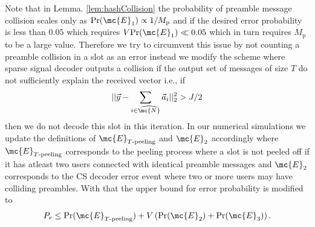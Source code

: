 \documentclass[final,onecolumn,12pt]{IEEEtran}
\def\Pr{\mathrm{Pr}}
\begin{document}
\begin{remark}
Note that in Lemma. \ref{lem:hashCollision} the probability of preamble message collision scales only as $\Pr(\mc{E}_1)\propto 1/M_\mathrm{p}$ and if the desired error probability is less than $0.05$ which requires $V\Pr(\mc{E}_1)\ll 0.05$ which in turn requires $M_\mathrm{p}$ to be a large value. Therefore we try to circumvent this issue by not counting a preamble collision in a slot as an error instead we modify the scheme where sparse signal decoder outputs a collision if the output set of messages of size $T$ do not sufficiently explain the received vector i.e., if
\[
||\vec{y}-\sum_{i\in\widehat{\mc{N}}}\vec{a}_i||_2^2 >J/2
\]
then we do not decode this slot in this iteration. In our numerical simulations we update the definitions of $\mc{E}_{T\text{-peeling}}$ and $\mc{E}_2$ accordingly where $\mc{E}_{T\text{-peeling}}$ corresponds to the peeling process where a slot is not peeled off if it has atleast two users connected with identical preamble messages and $\mc{E}_2$  corresponds to the CS decoder error event where two or more users may have colliding preambles. With that the upper bound for error probability is modified to
\begin{align}
P_e\leq \Pr(\mc{E}_{T\text{-peeling}})+V\left(\Pr(\mc{E}_2)+\Pr(\mc{E}_3)\right).
\label{eqn:errPrb_split_modified}
\end{align}
\end{remark}
\end{document}
